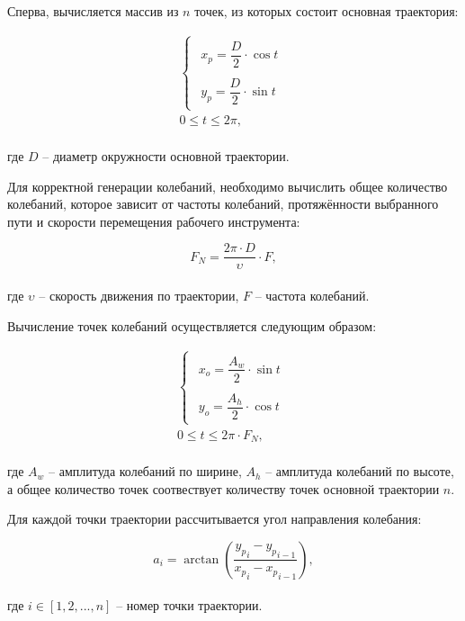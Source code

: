 Сперва, вычисляется массив из $n$ точек, из которых состоит основная траектория:

\begin{gather*}
    \begin{cases}
        \begin{aligned}
            x_p = \dfrac{D}{2} \cdot \cos t \\
            \\
            y_p = \dfrac{D}{2} \cdot \sin t
        \end{aligned}
    \end{cases} \\
    0 \leq t \leq 2 \pi,
\end{gather*} \\
где $D$ -- диаметр окружности основной траектории.

Для корректной генерации колебаний, необходимо вычислить общее количество колебаний, которое зависит от частоты колебаний, протяжённости выбранного пути и скорости перемещения рабочего инструмента:

\begin{equation*}
    F_N = \dfrac{2 \pi \cdot D}{\upsilon} \cdot F,
\end{equation*} \\
где $\upsilon$ -- скорость движения по траектории, $F$ -- частота колебаний.

Вычисление точек колебаний осуществляется следующим образом:

\begin{gather}
    \begin{cases}
        \label{eq:Trajectory:CircleOscillation}
        \begin{aligned}
            x_o = \dfrac{A_w}{2} \cdot \sin t \\
            \\
            y_o = \dfrac{A_h}{2} \cdot \cos t
        \end{aligned}
    \end{cases} \\
    \nonumber
    0 \leq t \leq 2 \pi \cdot F_N,
\end{gather} \\
где $A_w$ -- амплитуда колебаний по ширине, $A_h$ -- амплитуда колебаний по высоте, а общее количество точек соотвествует количеству точек основной траектории $n$.

Для каждой точки траектории рассчитывается угол направления колебания:

\begin{equation*}
    a_i = \arctan \left( \dfrac{{y_p}_i - {y_p}_{i-1}}{{x_p}_i - {x_p}_{i-1}} \right),
\end{equation*} \\
где $i \in [1, 2, ..., n]$ -- номер точки траектории.

